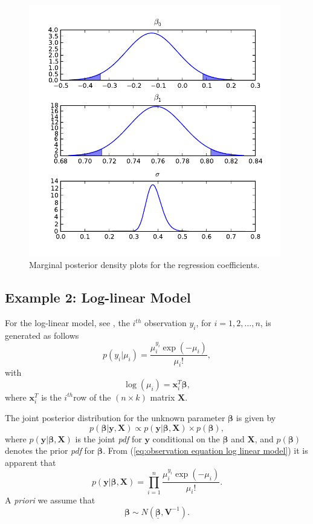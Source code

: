 \documentclass[article]{jss}
\begin{document}
\begin{figure}
  \begin{center}
    \includegraphics[width=11cm]{mpdreg.pdf}
  \end{center}
\caption{Marginal posterior density plots for the regression coefficients.}
\label{Flo:mpd reg}
\end{figure}



\subsection{Example 2: Log-linear Model}
\label{sub:Example-2:-Log-linear}

For the log-linear model, see \citet{GelmanCarlinSternRubin2004}, the $i^{th}$ observation $y_{i}$, for $i=1,2,\dots,n$, is generated
as follows\begin{equation}
p(y_{i}|\mu_{i})=\frac{\mu_{i}^{y_{i}}\exp(-\mu_{i})}{\mu_{i}!},\label{eq:observation equation log linear model}\end{equation}
 with \[
\log(\mu_{i})=\bm{x}_{i}^{T}\bm{\beta},\]
 where $\bm{x}_{i}^{T}$ is the $i^{th}$row of the $\left(n\times k\right)$
matrix $\bm{X}.$

The joint posterior distribution for the unknown parameter $\bm{\beta}$
is given by\begin{equation}
p(\bm{\beta}|\bm{y},\bm{X})\propto p(\bm{y}|\bm{\beta},\bm{X})\times p(\bm{\beta}),\label{eq:post log_linear}\end{equation}
 where $p(\bm{y}|\bm{\beta},\bm{X})$ is the joint \emph{pdf }for
$\bm{y}$ conditional on the $\bm{\beta}$ and $\bm{X}$, and $p(\bm{\beta})$
denotes the prior \emph{pdf }for $\bm{\beta}.$ From (\ref{eq:observation equation log linear model})
it is apparent that\[
p(\bm{y}|\bm{\beta},\bm{X})=\prod_{i=1}^{n}\frac{\mu_{i}^{y_{i}}\exp(-\mu_{i})}{\mu_{i}!}.\]
 A \emph{priori }we assume that \[
\bm{\beta}\sim N(\bm{\underline{\bm{\beta}}},\bm{V}^{-1}).\]
\end{document}

